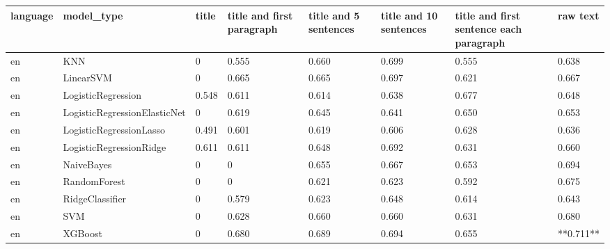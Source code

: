 \begin{tabular}{llllllll}
\toprule
language &                   model\_type &     title & title and first paragraph & title and 5 sentences & title and 10 sentences & title and first sentence each paragraph &  raw text \\
\midrule
      en &                          KNN &         0 &                     0.555 &                 0.660 &                  0.699 &                                   0.555 &     0.638 \\
      en &                    LinearSVM &         0 &                     0.665 &                 0.665 &                  0.697 &                                   0.621 &     0.667 \\
      en &           LogisticRegression &     0.548 &                     0.611 &                 0.614 &                  0.638 &                                   0.677 &     0.648 \\
      en & LogisticRegressionElasticNet &         0 &                     0.619 &                 0.645 &                  0.641 &                                   0.650 &     0.653 \\
      en &      LogisticRegressionLasso &     0.491 &                     0.601 &                 0.619 &                  0.606 &                                   0.628 &     0.636 \\
      en &      LogisticRegressionRidge &     0.611 &                     0.611 &                 0.648 &                  0.692 &                                   0.631 &     0.660 \\
      en &                   NaiveBayes &         0 &                         0 &                 0.655 &                  0.667 &                                   0.653 &     0.694 \\
      en &                 RandomForest &         0 &                         0 &                 0.621 &                  0.623 &                                   0.592 &     0.675 \\
      en &              RidgeClassifier &         0 &                     0.579 &                 0.623 &                  0.648 &                                   0.614 &     0.643 \\
      en &                          SVM &         0 &                     0.628 &                 0.660 &                  0.660 &                                   0.631 &     0.680 \\
      en &                      XGBoost &         0 &                     0.680 &                 0.689 &                  0.694 &                                   0.655 & **0.711** \\

\end{tabular}
